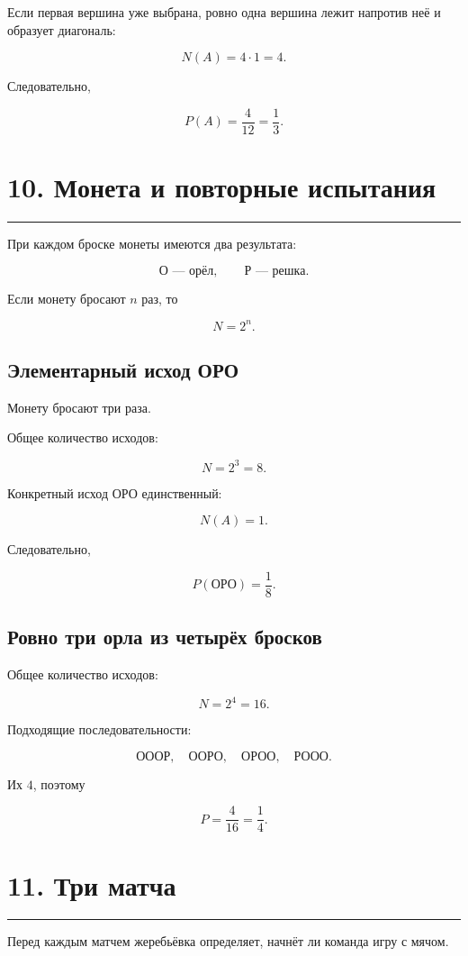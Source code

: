 \documentclass[a4paper,12pt]{article}
\newcommand{\sectionline}{%
    \vspace{0.2em}
    {\color{accent}\rule{\linewidth}{0.7pt}}
    \vspace{0.4em}
}
\begin{document}
Если первая вершина уже выбрана, ровно одна вершина лежит напротив неё и образует диагональ:

\[
N(A)=4\cdot1=4.
\]

Следовательно,

\[
\boxed{
P(A)=\frac4{12}=\frac13
}.
\]

\section*{10. Монета и повторные испытания}
\sectionline

При каждом броске монеты имеются два результата:

\[
\text{О --- орёл},\qquad
\text{Р --- решка}.
\]

Если монету бросают \(n\) раз, то

\[
\boxed{
N=2^n
}.
\]

\subsection*{Элементарный исход ОРО}

Монету бросают три раза.

Общее количество исходов:

\[
N=2^3=8.
\]

Конкретный исход ОРО единственный:

\[
N(A)=1.
\]

Следовательно,

\[
\boxed{
P(\text{ОРО})=\frac18
}.
\]

\subsection*{Ровно три орла из четырёх бросков}

Общее количество исходов:

\[
N=2^4=16.
\]

Подходящие последовательности:

\[
\text{ОООР},\quad
\text{ООРО},\quad
\text{ОРОО},\quad
\text{РООО}.
\]

Их \(4\), поэтому

\[
\boxed{
P=\frac4{16}=\frac14
}.
\]

\section*{11. Три матча}
\sectionline

Перед каждым матчем жеребьёвка определяет, начнёт ли команда игру с мячом.
\end{document}
